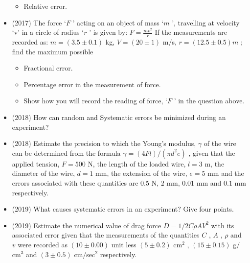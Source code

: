 \documentclass{article}
\begin{document}
\begin{itemize}
\begin{itemize}
\item Relative error. 
\end{itemize}
\item (2017)  The force ‘$ F$ ’ acting on an object of mass ‘$ m$ ’, travelling at velocity ‘v’ in a circle of radius ‘$ r$ ’ is given by: $ F= \frac{mv^{2}}{r}$ If the measurements are recorded as: $ m=(3.5 \pm 0.1)$ kg, $ V=(20\pm 1)$ m$/$s, $ r=(12.5\pm 0.5)m$ ; find the maximum possible
 \begin{itemize}
\item Fractional error. 
\item Percentage error in the measurement of force.
\item Show how you will record the reading of force, ‘$ F$ ’ in the question above. 
\end{itemize}
\item (2018)  How can random and Systematic errors be minimized during an experiment?
\item (2018)  Estimate the precision to which the Young’s modulus, $ \gamma $ of the wire can be determined from the formula $ \gamma =(4Fl)/(\pi d^{2} e)$ , given that the applied tension, $ F=500$ N, the length of the loaded wire,  $ l=3$ m, the diameter of the wire, $ d=1$ mm, the extension of the wire, $ e=5$ mm and the errors associated with these quantities are $ 0.5$ N, $ 2$ mm, $ 0.01$ mm and $ 0.1$ mm respectively. 
\item (2019)  What causes systematic errors in an experiment? Give four points. 
\item (2019)  Estimate the numerical value of drag force $ D= 1/2 C \rho  A V^{2}$ with its associated error given that the measurements of the quantities $ C$ , $ A$ , $ \rho $ and $ v$ were recorded as $ (10\pm 0.00)$ unit less $ (5\pm 0.2) $ cm$ ^{2}$ , $ (15\pm 0.15)$ g$/$cm$ ^{3}$ and $ (3\pm 0.5)$ cm$/$sec$ ^{2}$ respectively. 
\end{itemize}
\end{document}
